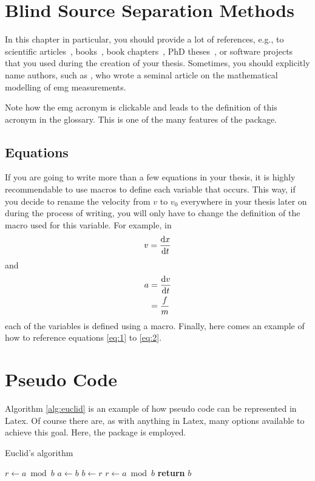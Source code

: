 \section{Blind Source Separation Methods}
In this chapter in particular, you should provide a lot of references, e.g., to scientific articles~\cite{farina99}, books~\cite{plonsey07}, book chapters~\cite{rodriguez-falces12}, PhD theses~\cite{fevotte03}, or software projects~\cite{r-project} that you used during the creation of your thesis.
Sometimes, you should explicitly name authors, such as \textcite{farina99}, who wrote a seminal article on the mathematical modelling of \gls{emg} measurements.

Note how the \gls{emg} acronym is clickable and leads to the definition of this acronym in the glossary.
This is one of the many features of the  package.

\subsection{Equations}
If you are going to write more than a few equations in your thesis, it is highly recommendable to use macros to define each variable that occurs.
This way, if you decide to rename the velocity from $v$ to $v_0$ everywhere in your thesis later on during the process of writing, you will only have to change the definition of the macro used for this variable.
For example, in
\begin{equation}
  \label{eq:1}
  v = \frac{\mathrm{d} x}{\mathrm{d} t}
\end{equation}
and
\begin{align}
  \label{eq:2}
  a &= \frac{\mathrm{d} v}{\mathrm{d} t} \nonumber \\
  &= \frac{f}{m}
\end{align}
each of the variables is defined using a macro.
Finally, here comes an example of how to reference equations \eqref{eq:1} to \eqref{eq:2}.

\section{Pseudo Code}
Algorithm \ref{alg:euclid} is an example of how pseudo code can be represented in Latex.
Of course there are, as with anything in Latex, many options available to achieve this goal.
Here, the  package is employed.
\begin{algorithm}
    \caption{Euclid's algorithm}
    \label{alg:euclid}
    \begin{algorithmic}[1] %
         
            \State $r\gets a \bmod b$
             
                \State $a \gets b$
                \State $b \gets r$
                \State $r \gets a \bmod b$
            \EndWhile\label{euclidendwhile}
            \State \textbf{return} $b$
        \EndProcedure
    \end{algorithmic}
\end{algorithm}


